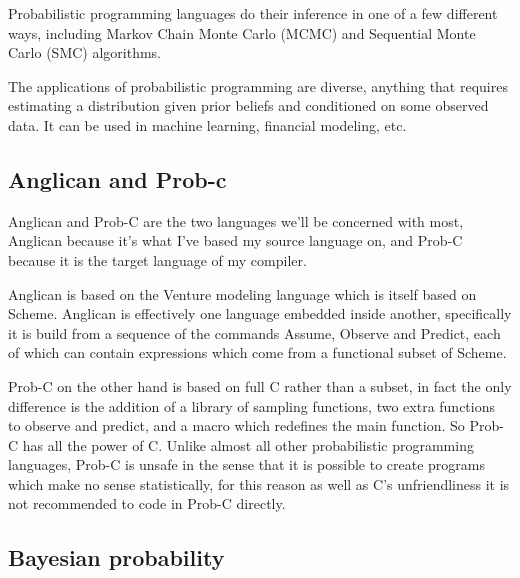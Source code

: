 \documentclass[a4paper]{article}
\begin{document}
Probabilistic programming languages do their inference in one of a few different ways, including Markov Chain Monte Carlo (MCMC) and Sequential Monte Carlo (SMC) algorithms.

The applications of probabilistic programming are diverse, anything that requires estimating a distribution given prior beliefs and conditioned on some observed data. It can be used in machine learning, financial modeling, etc.




\subsection{Anglican and Prob-c}

Anglican and Prob-C are the two languages we'll be concerned with most, Anglican because it's what I've based my source language on, and Prob-C because it is the target language of my compiler.

Anglican is based on the Venture modeling language which is itself based on Scheme. Anglican is effectively one language embedded inside another, specifically it is build from a sequence of the commands Assume, Observe and Predict, each of which can contain expressions which come from a functional subset of Scheme.

Prob-C on the other hand is based on full C rather than a subset, in fact the only difference is the addition of a library of sampling functions, two extra functions to observe and predict, and a macro which redefines the main function. So Prob-C has all the power of C. Unlike almost all other probabilistic programming languages, Prob-C is unsafe in the sense that it is possible to create programs which make no sense statistically, for this reason as well as C's unfriendliness it is not recommended to code in Prob-C directly.




\subsection{Bayesian probability}
\end{document}
